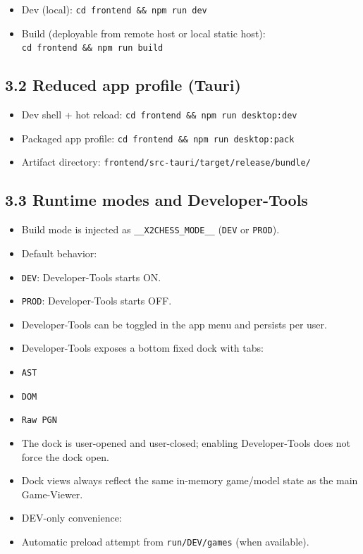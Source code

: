 \documentclass[]{article}
\providecommand{\tightlist}{%
  \setlength{\itemsep}{0pt}\setlength{\parskip}{0pt}}
\begin{document}
\begin{itemize}
\tightlist
\item
  Dev (local): \texttt{cd\ frontend\ \&\&\ npm\ run\ dev}
\item
  Build (deployable from remote host or local static host):
  \texttt{cd\ frontend\ \&\&\ npm\ run\ build}
\end{itemize}

\subsection{3.2 Reduced app profile
(Tauri)}\label{reduced-app-profile-tauri}

\begin{itemize}
\tightlist
\item
  Dev shell + hot reload:
  \texttt{cd\ frontend\ \&\&\ npm\ run\ desktop:dev}
\item
  Packaged app profile:
  \texttt{cd\ frontend\ \&\&\ npm\ run\ desktop:pack}
\item
  Artifact directory: \texttt{frontend/src-tauri/target/release/bundle/}
\end{itemize}

\subsection{3.3 Runtime modes and
Developer-Tools}\label{runtime-modes-and-developer-tools}

\begin{itemize}
\tightlist
\item
  Build mode is injected as \texttt{\_\_X2CHESS\_MODE\_\_} (\texttt{DEV}
  or \texttt{PROD}).
\item
  Default behavior:
\item
  \texttt{DEV}: Developer-Tools starts ON.
\item
  \texttt{PROD}: Developer-Tools starts OFF.
\item
  Developer-Tools can be toggled in the app menu and persists per user.
\item
  Developer-Tools exposes a bottom fixed dock with tabs:
\item
  \texttt{AST}
\item
  \texttt{DOM}
\item
  \texttt{Raw\ PGN}
\item
  The dock is user-opened and user-closed; enabling Developer-Tools does
  not force the dock open.
\item
  Dock views always reflect the same in-memory game/model state as the
  main Game-Viewer.
\item
  DEV-only convenience:
\item
  Automatic preload attempt from \texttt{run/DEV/games} (when
  available).
\end{itemize}
\end{document}
